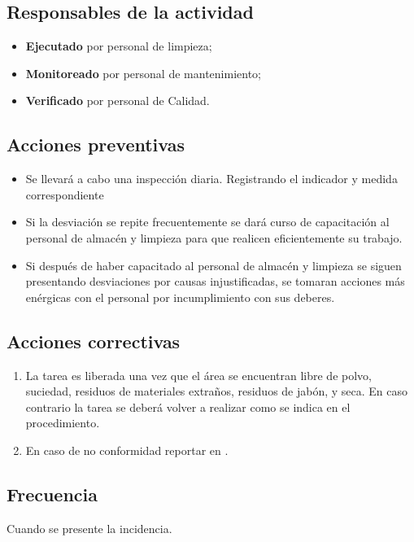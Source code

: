 \subsection{Responsables de la actividad}
\begin{itemize}
	\item \textbf{Ejecutado} por personal de limpieza;
	\item \textbf{Monitoreado} por personal de mantenimiento;
	\item \textbf{Verificado} por personal de Calidad.
\end{itemize}

\subsection{Acciones preventivas}
\begin{itemize}
	\item Se llevará a cabo una inspección diaria. Registrando el indicador y medida correspondiente
	\item Si la desviación se repite frecuentemente se dará curso de capacitación al personal de almacén y limpieza para que realicen eficientemente su trabajo.
	\item Si después de haber capacitado al personal de almacén y limpieza se siguen presentando desviaciones por causas injustificadas, se tomaran acciones más enérgicas con el personal por incumplimiento con sus deberes.
\end{itemize}

\subsection{Acciones correctivas}
\begin{enumerate}
	\item La tarea es liberada una vez que el área se encuentran libre de polvo, suciedad, residuos de materiales extraños, residuos de jabón, y seca. En caso contrario la tarea se deberá volver a realizar como se indica en el procedimiento.
	\item En caso de no conformidad reportar en \RAC.
\end{enumerate}

\subsection{Frecuencia}
Cuando se presente la incidencia.

